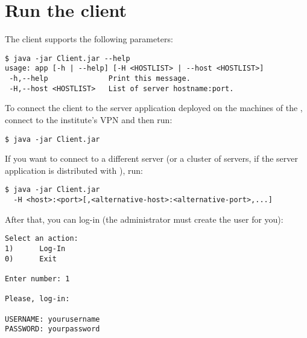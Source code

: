 \section{Run the client}

The client supports the following parameters:

\begin{verbatim}
$ java -jar Client.jar --help
usage: app [-h | --help] [-H <HOSTLIST> | --host <HOSTLIST>]
 -h,--help              Print this message.
 -H,--host <HOSTLIST>   List of server hostname:port.
\end{verbatim}

To connect the client to the server application deployed on the machines of the
\theinstitute, connect to the institute's VPN and then run:

\begin{verbatim}
$ java -jar Client.jar
\end{verbatim}

If you want to connect to a different server (or a cluster of servers, if the
server application is distributed with ), run:

\begin{verbatim}
$ java -jar Client.jar
  -H <host>:<port>[,<alternative-host>:<alternative-port>,...]
\end{verbatim}

After that, you can log-in (the administrator must create the user for you):

\begin{verbatim}
Select an action:
1)      Log-In
0)      Exit

Enter number: 1

Please, log-in:

USERNAME: yourusername
PASSWORD: yourpassword
\end{verbatim}
